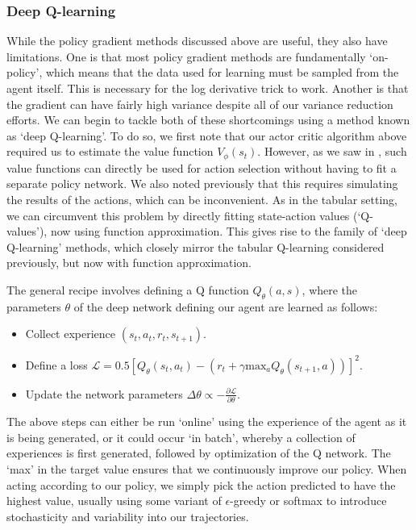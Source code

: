 \subsubsection*{Deep Q-learning}

While the policy gradient methods discussed above are useful, they also have limitations.
One is that most policy gradient methods are fundamentally `on-policy', which means that the data used for learning must be sampled from the agent itself.
This is necessary for the log derivative trick to work.
Another is that the gradient can have fairly high variance despite all of our variance reduction efforts.
We can begin to tackle both of these shortcomings using a method known as `deep Q-learning'.
To do so, we first note that our actor critic algorithm above required us to estimate the value function $V_\phi(s_t)$.
However, as we saw in , such value functions can directly be used for action selection without having to fit a separate policy network.
We also noted previously that this requires simulating the results of the actions, which can be inconvenient.
As in the tabular setting, we can circumvent this problem by directly fitting state-action values (`Q-values'), now using function approximation.
This gives rise to the family of `deep Q-learning' methods, which closely mirror the tabular Q-learning considered previously, but now with function approximation.

The general recipe involves defining a Q function $Q_\theta(a, s)$, where the parameters $\theta$ of the deep network defining our agent are learned as follows:
\begin{itemize}
    \item Collect experience $(s_t, a_t, r_t, s_{t+1})$.
    \item Define a loss $\mathcal{L} = 0.5 [ Q_\theta(s_t, a_t) - (r_t + \gamma \text{max}_a Q_\theta(s_{t+1}, a)) ]^2 $.
    \item Update the network parameters $\Delta \theta \propto - \frac{\partial \mathcal{L}}{\partial \theta}$.
\end{itemize}
The above steps can either be run `online' using the experience of the agent as it is being generated, or it could occur `in batch', whereby a collection of experiences is first generated, followed by optimization of the Q network.
The `max' in the target value ensures that we continuously improve our policy.
When acting according to our policy, we simply pick the action predicted to have the highest value, usually using some variant of $\epsilon$-greedy or softmax to introduce stochasticity and variability into our trajectories.

